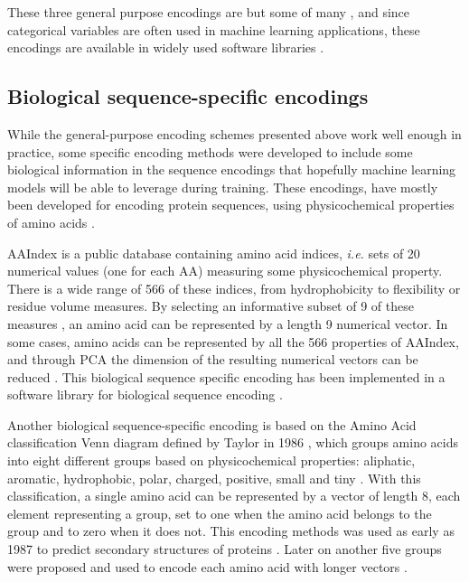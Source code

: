 \documentclass[
  11pt,
  twoside,
  BCOR=10mm,
  listof=totoc]{scrbook}
\begin{document}
These three general purpose encodings are but some of many \autocite{potdarComparativeStudyCategorical2017}, and since categorical variables are often used in machine learning applications, these encodings are available in widely used software libraries \autocite{mcginnisScikitLearnContribCategoricalEncodingRelease2018}.

\hypertarget{biological-sequence-specific-encodings}{%
\subsection{Biological sequence-specific encodings}\label{biological-sequence-specific-encodings}}

While the general-purpose encoding schemes presented above work well enough in practice, some specific encoding methods were developed to include some biological information in the sequence encodings that hopefully machine learning models will be able to leverage during training. These encodings, have mostly been developed for encoding protein sequences, using physicochemical properties of amino acids \autocite{zamaniAminoAcidEncoding2011}.

AAIndex \autocite{kawashima2008} is a public database containing amino acid indices, \emph{i.e.} sets of 20 numerical values (one for each AA) measuring some physicochemical property. There is a wide range of 566 of these indices, from hydrophobicity to flexibility or residue volume measures. By selecting an informative subset of 9 of these measures \autocite{liPredictionProteinStructural2008}, an amino acid can be represented by a length 9 numerical vector. In some cases, amino acids can be represented by all the 566 properties of AAIndex, and through PCA the dimension of the resulting numerical vectors can be reduced \autocite{nanniNewEncodingTechnique2011}. This biological sequence specific encoding has been implemented in a software library for biological sequence encoding \autocite{chenIFeaturePythonPackage2018}.

Another biological sequence-specific encoding is based on the Amino Acid classification Venn diagram defined by Taylor in 1986 \autocite{taylorClassificationAminoAcid1986}, which groups amino acids into eight different groups based on physicochemical properties: aliphatic, aromatic, hydrophobic, polar, charged, positive, small and tiny . With this classification, a single amino acid can be represented by a vector of length 8, each element representing a group, set to one when the amino acid belongs to the group and to zero when it does not. This encoding methods was used as early as 1987 to predict secondary structures of proteins \autocite{zvelebilPredictionProteinSecondary1987}. Later on another five groups were proposed and used to encode each amino acid with longer vectors \autocite{kremerMethodSystemComputer2009}.
\end{document}
